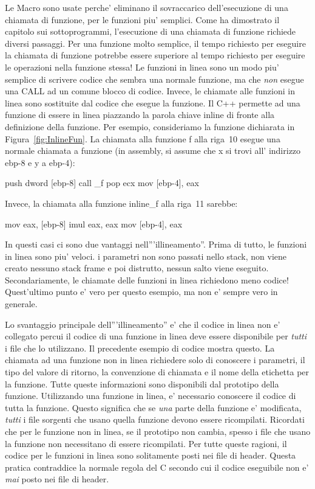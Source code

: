 Le Macro sono usate perche' eliminano il sovraccarico dell'esecuzione
di una chiamata di funzione, per le funzioni piu' semplici. Come ha 
dimostrato il capitolo sui sottoprogrammi, l'esecuzione di una 
chiamata di funzione richiede diversi passaggi. Per una funzione molto
semplice, il tempo richiesto per eseguire la chiamata di funzione 
potrebbe essere superiore al tempo richiesto per eseguire le operazioni
nella funzione stessa! Le funzioni in linea sono un modo piu' semplice
di scrivere codice che sembra una normale funzione, ma che \emph{non}
esegue una {\code CALL} ad un comune blocco di codice. Invece, le chiamate
alle funzioni in linea sono sostituite dal codice che esegue la funzione.
Il C++ permette ad una funzione di essere in linea piazzando la parola
chiave {\code inline} di fronte alla definizione della funzione. Per 
esempio, consideriamo la funzione dichiarata in Figura~\ref{fig:InlineFun}.
La chiamata alla funzione {\code f} alla riga~10 esegue una normale
chiamata a funzione (in assembly, si assume che {\code x} si trovi all'
indirizzo {\code ebp-8} e {\code y} a {\code ebp-4}):
\begin{AsmCodeListing}
      push   dword [ebp-8]
      call   _f
      pop    ecx
      mov    [ebp-4], eax
\end{AsmCodeListing}
Invece, la chiamata alla funzione {\code inline\_f} alla riga~11 sarebbe:
\begin{AsmCodeListing}
      mov    eax, [ebp-8]
      imul   eax, eax
      mov    [ebp-4], eax
\end{AsmCodeListing}

In questi casi ci sono due vantaggi nell'''illineamento''. Prima di tutto,
le funzioni in linea sono piu' veloci. i parametri non sono passati nello 
stack, non viene creato nessuno stack frame e poi distrutto, nessun salto 
viene eseguito. Secondariamente, le chiamate delle funzioni in linea richiedono
meno codice! Quest'ultimo punto e' vero per questo esempio, ma non e' sempre
vero in generale.

Lo svantaggio principale dell'''illineamento'' e' che il codice
in linea non e' collegato percui il codice di una funzione in linea
deve essere disponibile per \emph{tutti} i file che lo utilizzano. 
Il precedente esempio di codice mostra questo. La chiamata ad una
funzione non in linea richiedere solo di conoscere i parametri, il tipo
del valore di ritorno, la convenzione di chiamata e il nome della
etichetta per la funzione. Tutte queste informazioni sono disponibili
dal prototipo della funzione. Utilizzando una funzione in linea, e' 
necessario conoscere il codice di tutta la funzione. Questo significa
che se \emph{una} parte della funzione e' modificata, \emph{tutti}
i file sorgenti che usano quella funzione devono essere ricompilati.
Ricordati che per le funzione non in linea, se il prototipo non cambia,
spesso i file che usano la funzione non necessitano di essere 
ricompilati. Per tutte queste ragioni, il codice per le funzioni in 
linea sono solitamente posti nei file di header. Questa pratica 
contraddice la normale regola del C secondo cui il codice eseguibile non 
e' \emph{mai} posto nei file di header.  

